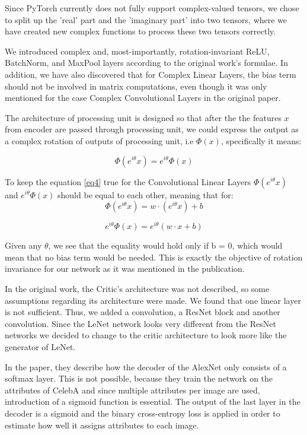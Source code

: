 Since PyTorch currently does not fully support complex-valued tensors, we chose to split up the 'real' part and the 'imaginary part' into two tensors, where we have created new complex functions to process these two tensors correctly.

We introduced complex and, most-importantly, rotation-invariant ReLU, BatchNorm, and MaxPool layers according to the original work's formulae.
In addition, we have also discovered that for Complex Linear Layers, the bias term should not be involved in matrix computations, even though it was only mentioned for the case Complex Convolutional Layers in the original paper. 

The architecture of processing unit is designed so that after the the features $x$ from encoder are passed through processing unit, we could express the output as a complex rotation of outputs of processing unit, i.e $\Phi(x)$, specifically it means:

\begin{equation}
    \Phi(e^{i \theta}x) = e^{i \theta} \Phi (x)
    \label{eq4}
\end{equation}

To keep the equation \ref{eq4} true for the Convolutional Linear Layers $\Phi(e^{i \theta} x )$ and $e^{i \theta} \Phi(x)$ should be equal to each other, meaning that for:
\begin{equation}
    \Phi(e^{i \theta}x) = w  \cdot (e^{i \theta}x) + b  
    \label{eq2}
\end{equation}

\begin{equation}
    e^{i \theta} \Phi (x) = e^{i \theta} (w \cdot x + b)
    \label{eq3}
\end{equation}

Given any $\theta$, we see that the equality would hold only if b = 0, which would mean that no bias term would be needed. This is exactly the objective of rotation invariance for our network as it was mentioned in the publication.

In the original work, the Critic's architecture was not described, so some assumptions regarding its architecture were made. We found that one linear layer is not sufficient. Thus, we added a convolution, a ResNet block and another convolution.
Since the LeNet network looks very different from the ResNet networks we decided to change to the critic architecture to look more like the generator of LeNet.

In the paper, they describe how the decoder of the AlexNet only consists of a softmax layer. This is not possible, because they train the network on the attributes of CelebA and since multiple attributes per image are used, introduction of a sigmoid function is essential. The output of the last layer in the decoder is a sigmoid and the binary cross-entropy loss is applied in order to estimate how well it assigns attributes to each image.

